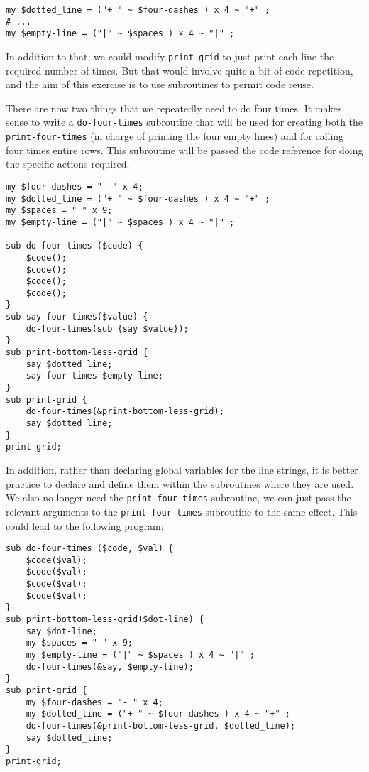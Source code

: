 \begin{verbatim}
my $dotted_line = ("+ " ~ $four-dashes ) x 4 ~ "+" ;
# ...
my $empty-line = ("|" ~ $spaces ) x 4 ~ "|" ;
\end{verbatim}

In addition to that, we could modify {\tt print-grid} to just print 
each line the required number of times. But that would involve 
quite a bit of code repetition, and the aim of this exercise 
is to use subroutines to permit code reuse.

There are now two things that we repeatedly need to do four times. 
It makes sense to write a {\tt do-four-times} subroutine that 
will be used for creating both the {\tt print-four-times} (in 
charge of printing the four empty lines) and for calling 
four times entire rows. This subroutine will be passed the 
code reference for doing the specific actions required.

\begin{verbatim}
my $four-dashes = "- " x 4;
my $dotted_line = ("+ " ~ $four-dashes ) x 4 ~ "+" ;
my $spaces = " " x 9;
my $empty-line = ("|" ~ $spaces ) x 4 ~ "|" ;

sub do-four-times ($code) {
    $code();
    $code();
    $code();
    $code();
}
sub say-four-times($value) {
    do-four-times(sub {say $value});
}
sub print-bottom-less-grid {
    say $dotted_line;
    say-four-times $empty-line;
}
sub print-grid {
    do-four-times(&print-bottom-less-grid);
    say $dotted_line;
}
print-grid;
\end{verbatim}

In addition, rather than declaring global variables for the 
line strings, it is better practice to declare and define them 
within the subroutines where they are used. We also no longer 
need the {\tt print-four-times} subroutine, we can just 
pass the relevant arguments to the {\tt print-four-times} 
subroutine to the same effect. This could lead to the 
following program:

\begin{verbatim}
sub do-four-times ($code, $val) {
    $code($val);
    $code($val);
    $code($val);
    $code($val);
}
sub print-bottom-less-grid($dot-line) {
    say $dot-line;
    my $spaces = " " x 9;
    my $empty-line = ("|" ~ $spaces ) x 4 ~ "|" ;
    do-four-times(&say, $empty-line);
}
sub print-grid {
    my $four-dashes = "- " x 4;
    my $dotted_line = ("+ " ~ $four-dashes ) x 4 ~ "+" ;
    do-four-times(&print-bottom-less-grid, $dotted_line);
    say $dotted_line;
}
print-grid;
\end{verbatim}


